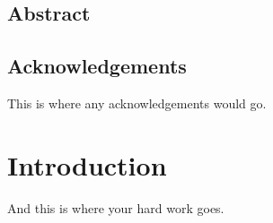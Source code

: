 \documentclass[oneside, letterpaper, 12pt, oldfontcommands]{memoir}
\begin{document}
\frontmatter

\theumiabstract

\thetitlepage
\clearpage

\thecopyrightpage
\clearpage

\cleardoublepage
\setcounter{page}{1}

\section{Abstract}
\uwabstract
\cleardoublepage

\section{Acknowledgements}
This is where any acknowledgements would go.
\clearpage

\tableofcontents %

\mainmatter

\chapter{Introduction}
And this is where your hard work goes.
\end{document}
